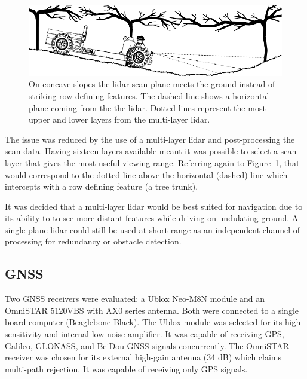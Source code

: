 \documentclass[preprint,authoryear,12pt]{elsarticle}
\begin{document}
        \begin{figure}[htb]
            \centering
            \includegraphics[width=\linewidth]{imgs/concave_slope/concave_slope_v4.pdf}
            \caption{
                On concave slopes the lidar scan plane meets the ground instead of striking row-defining features.
                The dashed line shows a horizontal plane coming from the the lidar.
                Dotted lines represent the most upper and lower layers from the multi-layer lidar.
            }
            \label{fig:concaveSlope}
        \end{figure}

        The issue was reduced by the use of a multi-layer lidar and post-processing the scan data.
        Having sixteen layers available meant it was possible to select a scan layer that gives the most useful viewing range.
        Referring again to Figure~\ref{fig:concaveSlope}, that would correspond to the dotted line above the horizontal (dashed) line which intercepts with a row defining feature (a tree trunk).

        It was decided that a multi-layer lidar would be best suited for navigation due to its ability to to see more distant features while driving on undulating ground.
        A single-plane lidar could still be used at short range as an independent channel of processing for redundancy or obstacle detection.

    \subsection{GNSS}
        Two GNSS receivers were evaluated: a Ublox Neo-M8N module and an OmniSTAR 5120VBS with AX0 series antenna.
        Both were connected to a single board computer (Beaglebone Black).
        The Ublox module was selected for its high sensitivity and internal low-noise amplifier.
        It was capable of receiving GPS, Galileo, GLONASS, and BeiDou GNSS signals concurrently.
        The OmniSTAR receiver was chosen for its external high-gain antenna (34 dB) which claims multi-path rejection.
        It was capable of receiving only GPS signals.
\end{document}
